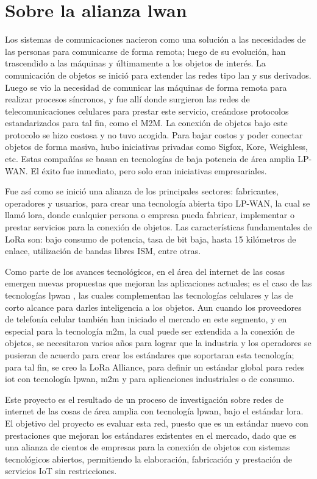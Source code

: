 \section{Sobre la alianza \gls{lwan}}

Los sistemas de comunicaciones nacieron como una solución a las necesidades de las personas para comunicarse de forma remota; luego de su evolución, han trascendido a las máquinas y últimamente a los objetos de interés. La comunicación de objetos se inició para extender las redes tipo \gls{lan} y sus derivados. Luego se vio la necesidad de comunicar las máquinas de forma remota para realizar procesos síncronos, y fue allí donde surgieron las redes de telecomunicaciones celulares para prestar este servicio, creándose protocolos estandarizados para tal fin, como el M2M. La conexión de objetos bajo este protocolo se hizo costosa y no tuvo acogida. Para bajar costos y poder conectar objetos de forma masiva, hubo iniciativas privadas como Sigfox, Kore, Weighless, etc. Estas compañías se basan en tecnologías de baja potencia de área amplia LP-WAN. El éxito fue inmediato, pero solo eran iniciativas empresariales.

Fue así como se inició una alianza de los principales sectores: fabricantes, operadores y usuarios, para crear una tecnología abierta tipo LP-WAN, la cual se llamó \gls{lora}, donde cualquier persona o empresa pueda fabricar, implementar o prestar servicios para la conexión de objetos. Las características fundamentales de LoRa son: bajo consumo de potencia, tasa de bit baja, hasta 15 kilómetros de enlace, utilización de bandas libres ISM, entre otras. 

Como parte de los avances tecnológicos, en el área del internet de las cosas emergen nuevas propuestas que mejoran las aplicaciones actuales; es el caso de las tecnologías \gls{lpwan} \cite{LoRa-2015}, las cuales complementan las tecnologías celulares y las de corto alcance para darles inteligencia a los objetos. Aun cuando los proveedores de telefonía celular también han iniciado el mercado en este segmento, y en especial para la tecnología \gls{m2m}, la cual puede ser extendida a la conexión de objetos, se necesitaron varios años para lograr que la industria y los operadores se pusieran de acuerdo para crear los estándares que soportaran esta tecnología; para tal fin, se creo la LoRa Alliance, para definir un estándar global para redes \gls{iot} con tecnología \gls{lpwan}, \gls{m2m} y para aplicaciones industriales o de consumo.

Este proyecto es el resultado de un proceso de investigación sobre redes de internet de las cosas de área amplia con tecnología \gls{lpwan}, bajo el estándar \gls{lora}. El objetivo del proyecto es evaluar esta red, puesto que es un estándar nuevo con prestaciones que mejoran los estándares existentes en el mercado, dado que es una alianza de cientos de empresas para la conexión de objetos con sistemas tecnológicos abiertos, permitiendo la elaboración, fabricación y prestación de servicios IoT sin restricciones.

